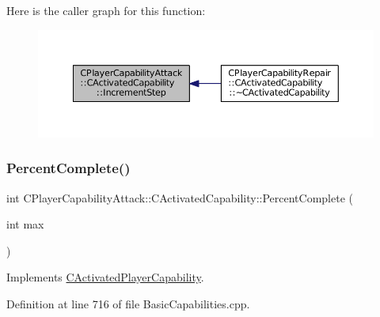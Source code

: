 Here is the caller graph for this function\+:\nopagebreak
\begin{figure}[H]
\begin{center}
\leavevmode
\includegraphics[width=350pt]{classCPlayerCapabilityAttack_1_1CActivatedCapability_a6b772cbd6be96fbd9bf88380b143856c_icgraph}
\end{center}
\end{figure}
\hypertarget{classCPlayerCapabilityAttack_1_1CActivatedCapability_a75866109b62de0522622b03137461519}{}\label{classCPlayerCapabilityAttack_1_1CActivatedCapability_a75866109b62de0522622b03137461519} 
\subsubsection{\texorpdfstring{Percent\+Complete()}{PercentComplete()}}
{\footnotesize\ttfamily int C\+Player\+Capability\+Attack\+::\+C\+Activated\+Capability\+::\+Percent\+Complete (\begin{DoxyParamCaption}\item[{int}]{max }\end{DoxyParamCaption})\hspace{0.3cm}{\ttfamily [virtual]}}



Implements \hyperlink{classCActivatedPlayerCapability_a405dc6076058006a4f801727de4cfe4d}{C\+Activated\+Player\+Capability}.



Definition at line 716 of file Basic\+Capabilities.\+cpp.


